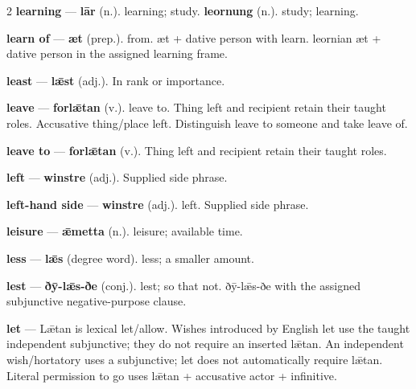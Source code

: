 \begin{multicols}{2}
\textbf{learning} — \textbf{lār} (n.). learning; study. \textbf{leornung} (n.). study; learning.\par
\textbf{learn of} — \textbf{æt} (prep.). from. æt + dative person with learn. leornian æt + dative person in the assigned learning frame.\par
\textbf{least} — \textbf{lǣst} (adj.). In rank or importance.\par
\textbf{leave} — \textbf{forlǣtan} (v.). leave to. Thing left and recipient retain their taught roles. Accusative thing/place left. Distinguish leave to someone and take leave of.\par
\textbf{leave to} — \textbf{forlǣtan} (v.). Thing left and recipient retain their taught roles.\par
\textbf{left} — \textbf{winstre} (adj.). Supplied side phrase.\par
\textbf{left-hand side} — \textbf{winstre} (adj.). left. Supplied side phrase.\par
\textbf{leisure} — \textbf{ǣmetta} (n.). leisure; available time.\par
\textbf{less} — \textbf{lǣs} (degree word). less; a smaller amount.\par
\textbf{lest} — \textbf{ðȳ-lǣs-ðe} (conj.). lest; so that not. ðȳ-lǣs-ðe with the assigned subjunctive negative-purpose clause.\par
\textbf{let} — Lǣtan is lexical let/allow. Wishes introduced by English let use the taught independent subjunctive; they do not require an inserted lǣtan. An independent wish/hortatory uses a subjunctive; let does not automatically require lǣtan. Literal permission to go uses lǣtan + accusative actor + infinitive.\par

\end{multicols}
